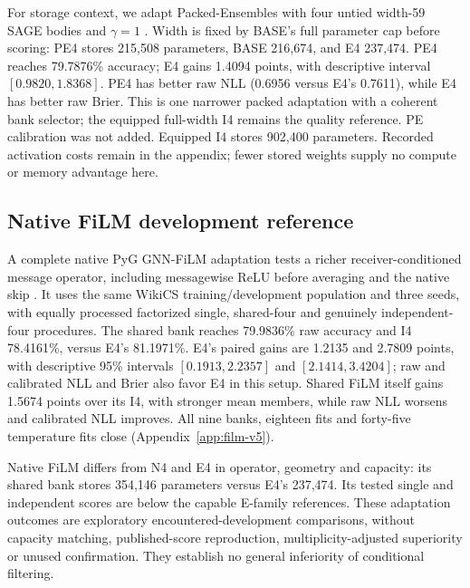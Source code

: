 For storage context, we adapt Packed-Ensembles with four untied width-59 SAGE bodies and $\gamma=1$ \citep{laurent2023packed}. Width is fixed by BASE's full parameter cap before scoring: PE4 stores 215,508 parameters, BASE 216,674, and E4 237,474. PE4 reaches 79.7876\% accuracy; E4 gains 1.4094 points, with descriptive interval $[0.9820,1.8368]$. PE4 has better raw NLL (0.6956 versus E4's 0.7611), while E4 has better raw Brier. This is one narrower packed adaptation with a coherent bank selector; the equipped full-width I4 remains the quality reference. PE calibration was not added. Equipped I4 stores 902,400 parameters. Recorded activation costs remain in the appendix; fewer stored weights supply no compute or memory advantage here.

\subsection{Native FiLM development reference}\label{sec:film}
A complete native PyG GNN-FiLM adaptation tests a richer receiver-conditioned message operator, including messagewise ReLU before averaging and the native skip \citep{brockschmidt2020film,fey2019pyg}. It uses the same WikiCS training/development population and three seeds, with equally processed factorized single, shared-four and genuinely independent-four procedures. The shared bank reaches 79.9836\% raw accuracy and I4 78.4161\%, versus E4's 81.1971\%. E4's paired gains are 1.2135 and 2.7809 points, with descriptive 95\% intervals $[0.1913,2.2357]$ and $[2.1414,3.4204]$; raw and calibrated NLL and Brier also favor E4 in this setup. Shared FiLM itself gains 1.5674 points over its I4, with stronger mean members, while raw NLL worsens and calibrated NLL improves. All nine banks, eighteen fits and forty-five temperature fits close (Appendix~\ref{app:film-v5}).

Native FiLM differs from N4 and E4 in operator, geometry and capacity: its shared bank stores 354,146 parameters versus E4's 237,474. Its tested single and independent scores are below the capable E-family references. These adaptation outcomes are exploratory encountered-development comparisons, without capacity matching, published-score reproduction, multiplicity-adjusted superiority or unused confirmation. They establish no general inferiority of conditional filtering.
